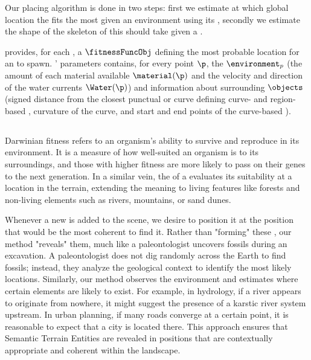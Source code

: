 Our placing algorithm is done in two steps: first we estimate at which global location the  fits the most given an environment using its , secondly we estimate the shape of the skeleton of this  should take given a .

 provides, for each , a  $\fitnessFuncObj$ defining the most probable location for an  to spawn. ' parameters contains, for every point $\p$, the  $\environment_p$ (the amount of each material available $\material(\p)$ and the velocity and direction of the water currents $\Water(\p)$) and information about surrounding  $\objects$ (signed distance from the closest punctual  or curve defining curve- and region-based , curvature of the curve, and start and end points of the curve-based ).

\subsection{}
Darwinian fitness refers to an organism's ability to survive and reproduce in its environment. It is a measure of how well-suited an organism is to its surroundings, and those with higher fitness are more likely to pass on their genes to the next generation. In a similar vein, the  of a  evaluates its suitability at a location in the terrain, extending the meaning to living features like forests and non-living elements such as rivers, mountains, or sand dunes.

Whenever a new  is added to the scene, we desire to position it at the position that would be the most coherent to find it. Rather than "forming" these , our method "reveals" them, much like a paleontologist uncovers fossils during an excavation. A paleontologist does not dig randomly across the Earth to find fossils; instead, they analyze the geological context to identify the most likely locations. Similarly, our method observes the environment and estimates where certain elements are likely to exist. For example, in hydrology, if a river appears to originate from nowhere, it might suggest the presence of a karstic river system upstream. In urban planning, if many roads converge at a certain point, it is reasonable to expect that a city is located there. This approach ensures that Semantic Terrain Entities are revealed in positions that are contextually appropriate and coherent within the landscape.

